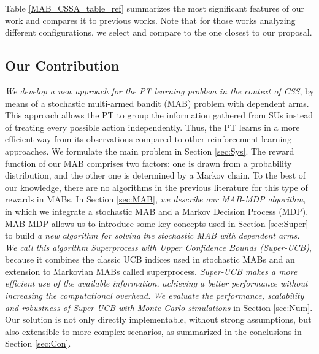 Table \ref{MAB_CSSA_table_ref} summarizes the most significant features of our work and compares it to previous works. 
Note that for those works analyzing different configurations, we select and compare to the one closest to our proposal. 

\subsection{Our Contribution}

\textit{We develop a new approach for the PT learning problem in the context of CSS}, by means of a stochastic multi-armed bandit (MAB) problem with dependent arms. This approach allows the PT to group the information gathered from SUs instead of treating every possible action independently. Thus, the PT learns in a more efficient way from its observations compared to other reinforcement learning approaches. We formulate the main problem in Section \ref{sec:Sys}.
The reward function of our MAB comprises two factors: one is drawn from a probability distribution, and the other one is determined by a Markov chain.
To the best of our knowledge, there are no algorithms in the previous literature for this type of rewards in MABs. 
In Section \ref{sec:MAB}, \textit{we describe our MAB-MDP algorithm}, in which we integrate a stochastic MAB and a Markov Decision Process (MDP). MAB-MDP allows us to introduce some key concepts used in Section \ref{sec:Super} to build \textit{a new algorithm for solving the stochastic MAB with dependent arms. We call this algorithm Superprocess with Upper Confidence Bounds (Super-UCB)}, because it combines the classic UCB indices used in stochastic MABs and an extension to Markovian MABs \cite{ref:Auer2002} called superprocess. \textit{Super-UCB makes a more efficient use of the available information, achieving a better performance without increasing the computational overhead.} \textit{We evaluate the performance, scalability and robustness of Super-UCB with Monte Carlo simulations} in Section \ref{sec:Num}.
Our solution is not only directly implementable, without strong assumptions, but also extensible to more complex scenarios, as summarized in the conclusions in Section \ref{sec:Con}.


